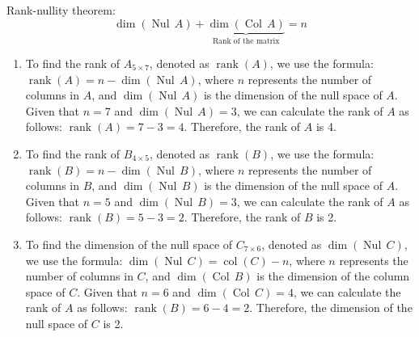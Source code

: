 \documentclass[letter,11pt]{article}
\theoremstyle{definition}
\begin{document}
\begin{tcolorbox}[boxrule=1mm, width=(.9\linewidth),before=\hfill,after=\hfill,adjusted title={Problem 7 Solutions}]
Rank-nullity theorem:  $$\operatorname{dim}(\operatorname{Nul} \, A) + \underbrace{\operatorname{dim}(\operatorname{Col} \, A)}_{\text{Rank of the matrix}} = n$$
\tcblower
    \begin{enumerate}[label = \roman*.]
        \item To find the rank of $A_{5 \times 7}$, denoted as $\operatorname{rank}(A)$, we use the formula: $\operatorname{rank}(A) = n - \operatorname{dim}(\operatorname{Nul} \, A)$, where $n$ represents the number of columns in $A$, and $\operatorname{dim}(\operatorname{Nul} \, A)$ is the dimension of the null space of $A$. Given that $n = 7$ and $\operatorname{dim}(\operatorname{Nul} \, A) = 3$, we can calculate the rank of $A$ as follows: $\operatorname{rank}(A) = 7 - 3 = 4$. Therefore, the rank of $A$ is 4.
        \item To find the rank of $B_{4\times 5}$, denoted as $\operatorname{rank}(B)$, we use the formula: $\operatorname{rank}(B) = n - \operatorname{dim}(\operatorname{Nul} \, B)$, where $n$ represents the number of columns in $B$, and $\operatorname{dim}(\operatorname{Nul} \, B)$ is the dimension of the null space of $A$. Given that $n = 5$ and $\operatorname{dim}(\operatorname{Nul} \, B) = 3$, we can calculate the rank of $A$ as follows: $\operatorname{rank}(B) = 5 - 3 = 2$. Therefore, the rank of $B$ is 2. 
        \item To find the dimension of the null space of $C_{7\times 6}$, denoted as $\operatorname{dim}(\operatorname{Nul} \, C)$, we use the formula: $\operatorname{dim}(\operatorname{Nul} \, C) = \operatorname{col}(C)-n$, where $n$ represents the number of columns in $C$, and $\operatorname{dim}(\operatorname{Col} \, B)$ is the dimension of the column space of $C$. Given that $n = 6$ and $\operatorname{dim}(\operatorname{Col} \, C) = 4$, we can calculate the rank of $A$ as follows: $\operatorname{rank}(B) = 6 - 4 = 2$. Therefore, the dimension of the null space of $C$ is 2. 
    \end{enumerate}
\end{tcolorbox}
\end{document}
